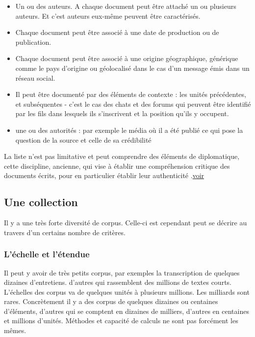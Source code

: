\documentclass[
  letterpaper,
  DIV=11,
  numbers=noendperiod]{scrreprt}
\begin{document}
\begin{itemize}
\item
  Un ou des auteurs. A chaque document peut être attaché un ou plusieurs
  auteurs. Et c'est auteurs eux-même peuvent être caractérisés.
\item
  Chaque document peut être associé à une date de production ou de
  publication.
\item
  Chaque document peut être associé à une origine géographique,
  générique comme le pays d'origine ou géolocalisé dans le cas d'un
  message émis dans un réseau social.
\item
  Il peut être documenté par des éléments de contexte : les unités
  précédentes, et subséquentes - c'est le cas des chats et des forums
  qui peuvent être identifié par les fils dans lesquels ils s'inscrivent
  et la position qu'ils y occupent.
\item
  une ou des autorités : par exemple le média où il a été publié ce qui
  pose la question de la source et celle de sa crédibilité
\end{itemize}

La liste n'est pas limitative et peut comprendre des éléments de
diplomatique, cette discipline, ancienne, qui vise à établir une
compréhension critique des documents écrits, pour en particulier établir
leur authenticité
.\href{http://theleme.enc.sorbonne.fr/cours/diplomatique}{voir}

\subsection{Une collection}\label{une-collection}

Il y a une très forte diversité de corpus. Celle-ci est cependant peut
se décrire au travers d'un certains nombre de critères.

\subsubsection{L'échelle et l'étendue}\label{luxe9chelle-et-luxe9tendue}

Il peut y avoir de très petits corpus, par exemples la transcription de
quelques dizaines d'entretiens. d'autres qui rassemblent des millions de
textes courts. L'échelles des corpus va de quelques unités à plusieurs
millions. Les milliards sont rares. Concrètement il y a des corpus de
quelques dizaines ou centaines d'éléments, d'autres qui se comptent en
dizaines de milliers, d'autres en centaines et millions d'unités.
Méthodes et capacité de calculs ne sont pas forcément les mêmes.
\end{document}
